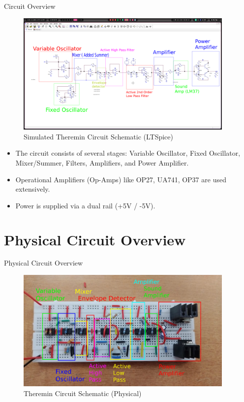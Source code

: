 \documentclass[10pt,xcolor={table,dvipsnames},t]{beamer}
\begin{document}
\begin{frame}{Circuit Overview}
\begin{figure}
    \centering
    \includegraphics[width=0.95\textwidth, height=0.7\textheight, keepaspectratio]{theremin_circuit.png}
    \caption{Simulated Theremin Circuit Schematic (LTSpice)}
    \label{fig:circuit_overview}
\end{figure}
\vspace{-1em}
\scriptsize
\begin{itemize}
    \item The circuit consists of several stages: Variable Oscillator, Fixed Oscillator, Mixer/Summer, Filters, Amplifiers, and Power Amplifier.
    \item Operational Amplifiers (Op-Amps) like OP27, UA741, OP37 are used extensively.
    \item Power is supplied via a dual rail (+5V / -5V).
\end{itemize}
\end{frame}

\section{Physical Circuit Overview}

\begin{frame}{Physical Circuit Overview}
\begin{figure}
    \centering
    \includegraphics[width=0.95\textwidth, height=0.7\textheight, keepaspectratio]{physical_cirucit.png}
    \caption{Theremin Circuit Schematic (Physical)}
    \label{fig:physical_circuit_overview}
\end{figure}
\vspace{-1em}
\end{frame}
\end{document}
